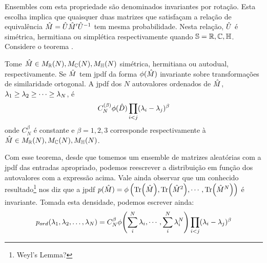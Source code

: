 Ensembles com esta propriedade são denominados invariantes por rotação. Esta escolha implica que quaisquer duas matrizes que satisfaçam a relação de equivalência $\hat M = \hat U \hat M' \hat U^{-1}$ tem mesma probabilidade. Nesta relação, $\hat U$ é simétrica, hermitiana ou simplética respectivamente quando $\mathbb{S} = \mathbb{R},\mathbb{C},\mathbb{H} $. Considere o teorema \cite{AlanThesis}.
\begin{thm}
	Tome $\hat M \in M_{\mathbb{R}}(N),  M_{\mathbb{C}}(N),  M_{\mathbb{H}}(N)$ simétrica, hermitiana ou autodual, respectivamente. Se  $\hat M$ tem jpdf da forma $\phi(\hat M)$ invariante sobre transformações de similaridade ortogonal. A jpdf dos $N$ autovalores ordenados de $\hat M$, $\lambda_1 \geq \lambda_2 \geq \dots \geq \lambda_N$, é $$ C_{N}^{(\beta)} \phi(\hat D) \prod_{i < j} (\lambda_i - \lambda_j)^{\beta}$$ onde $C_{N}^{\beta}$ é constante e $\beta = 1, 2, 3$ corresponde respectivamente à $\hat M \in M_{\mathbb{R}}(N),  M_{\mathbb{C}}(N),  M_{\mathbb{H}}(N)$. 
	\label{Teorema: Invariante}
\end{thm}

Com esse teorema, desde que tomemos um ensemble de matrizes aleatórias com a jpdf das entradas apropriado, podemos reescrever a distribuição em função dos autovalores com a expressão acima. Vale ainda observar que um conhecido resultado\footnote{Weyl's Lemma?} nos diz que a jpdf $p(\hat M)= \phi \left( \Tr(\hat M), \Tr(\hat M^2), \cdots, \Tr(\hat M^N) \right)$ é invariante. Tomada esta densidade, podemos escrever ainda:
\begin{equation}
	p_{ord}(\lambda_1, \lambda_2, \dots, \lambda_N) = C_{N}^{\beta} \phi{\left( \sum_i^N \lambda_i, \cdots, \sum_i^N \lambda_i^N \right)} \prod_{i < j} (\lambda_i - \lambda_j)^{\beta}
	\label{Equation: p-ord}
\end{equation}



